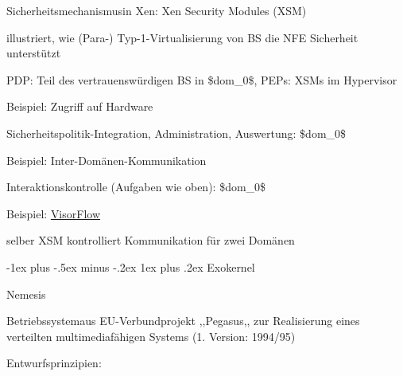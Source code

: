 \documentclass[a4paper]{article}
\makeatletter
\renewcommand{\subsubsection}{\@startsection{subsubsection}{3}{0mm}%
 {-1ex plus -.5ex minus -.2ex}%
 {1ex plus .2ex}%
 {\normalfont\small\bfseries}}
\makeatother
\begin{document}
\begin{multicols}{3}
    \begin{itemize*}
        \item
        Sicherheitsmechanismusin Xen: Xen Security Modules (XSM)
        \item
        illustriert, wie (Para-) Typ-1-Virtualisierung von BS die NFE
        Sicherheit unterstützt
        \item
        PDP: Teil des vertrauenswürdigen BS in \$dom\_0\$, PEPs: XSMs im
        Hypervisor
        \item
        Beispiel: Zugriff auf Hardware
        \begin{itemize*}
            \item Sicherheitspolitik-Integration, Administration, Auswertung: \$dom\_0\$
        \end{itemize*}
        \item
        Beispiel: Inter-Domänen-Kommunikation
        \begin{itemize*}
            \item Interaktionskontrolle (Aufgaben wie oben): \$dom\_0\$
            \item Beispiel: \href{https://www.flyn.org/projects/VisorFlow/}{VisorFlow}
            \item selber XSM kontrolliert Kommunikation für zwei Domänen
        \end{itemize*}
    \end{itemize*}


    \subsubsection{Exokernel}

    Nemesis

    \begin{itemize*}
        \item
        Betriebssystemaus EU-Verbundprojekt ,,Pegasus,, zur Realisierung eines
        verteilten multimediafähigen Systems (1. Version: 1994/95)
        \item
        Entwurfsprinzipien:
        \begin{enumerate*}


\end{enumerate*}
\end{itemize*}
\end{multicols}
\end{document}
